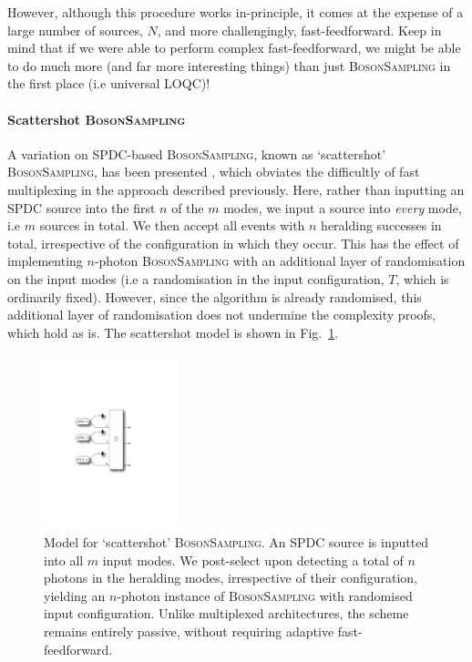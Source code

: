 However, although this procedure works in-principle, it comes at the expense of a large number of sources, $N$, and more challengingly, fast-feedforward. Keep in mind that if we were able to perform complex fast-feedforward, we might be able to do much more (and far more interesting things) than just \textsc{BosonSampling} in the first place (i.e universal LOQC)!

%
%

\paragraph{Scattershot \textsc{BosonSampling}} 

A variation on SPDC-based \textsc{BosonSampling}, known as `scattershot' \textsc{BosonSampling}, has been presented \cite{bib:RandBS}, which obviates the difficultly of fast multiplexing in the approach described previously. Here, rather than inputting an SPDC source into the first $n$ of the $m$ modes, we input a source into \textit{every} mode, i.e $m$ sources in total. We then accept all events with $n$ heralding successes in total, irrespective of the configuration in which they occur. This has the effect of implementing $n$-photon \textsc{BosonSampling} with an additional layer of randomisation on the input modes (i.e a randomisation in the input configuration, $T$, which is ordinarily fixed). However, since the algorithm is already randomised, this additional layer of randomisation does not undermine the complexity proofs, which hold as is. The scattershot model is shown in Fig.~\ref{fig:scattershot_model}.

\begin{figure}[!htbp]
\includegraphics[clip=true, width=0.35\textwidth]{scattershot_model}
\captionspacefig \caption{Model for `scattershot' \textsc{BosonSampling}. An SPDC source is inputted into all $m$ input modes. We post-select upon detecting a total of $n$ photons in the heralding modes, irrespective of their configuration, yielding an $n$-photon instance of \textsc{BosonSampling} with randomised input configuration. Unlike multiplexed architectures, the scheme remains entirely passive, without requiring adaptive fast-feedforward.} \label{fig:scattershot_model}
\end{figure}

